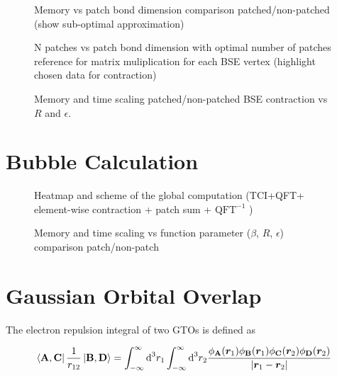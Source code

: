 \begin{figure}[ht!]
    \caption{Memory vs patch bond dimension comparison patched/non-patched (show sub-optimal approximation)}
\end{figure}

\begin{figure}[ht!]
    \caption{N patches vs patch bond dimension with optimal number of patches reference for matrix muliplication for each BSE vertex (highlight chosen data for contraction)}
\end{figure}

\begin{figure}[ht!]
    \caption{Memory and time scaling patched/non-patched BSE contraction vs $R$ and $\epsilon$.}
\end{figure}

\section{Bubble Calculation}


\begin{figure}[ht!]
    \caption{Heatmap and scheme of the global computation (TCI+QFT+ element-wise contraction + patch sum + $\textrm{QFT}^{-1}$ )}
\end{figure}

\begin{figure}[ht!]
    \caption{Memory and time scaling vs function parameter ($\beta$, $R$, $\epsilon$) comparison patch/non-patch }
\end{figure}


\section{Gaussian Orbital Overlap}


The electron repulsion integral of two GTOs is defined as

\begin{equation}
    \bra{\textbf{A}, \textbf{C}}\frac{1}{r_{12}}\ket{\textbf{B}, \textbf{D}} = \int_{-\infty}^\infty \text{d}^3r_1 \int_{-\infty}^\infty \text{d}^3r_2 \frac{\phi_\textbf{A}(\bm{r}_1) \phi_\textbf{B}(\bm{r}_1) \phi_\textbf{C}(\bm{r}_2) \phi_\textbf{D}(\bm{r}_2)}{|\bm{r}_1 - \bm{r}_2|}
\end{equation}

